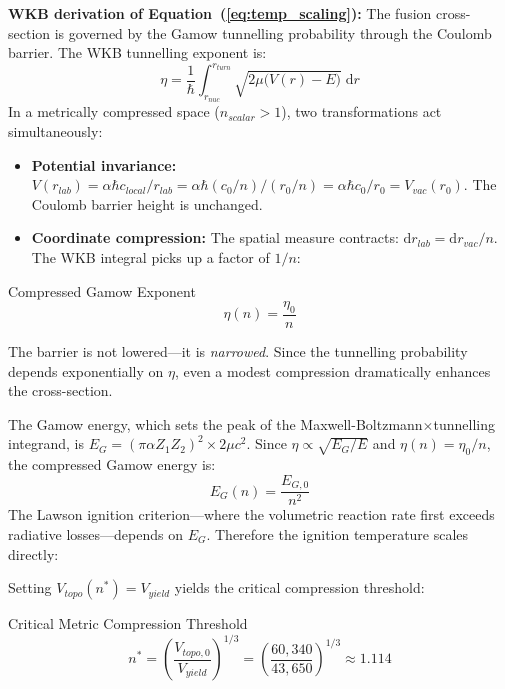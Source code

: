 \textbf{WKB derivation of Equation~(\ref{eq:temp_scaling}):} The fusion cross-section is governed by the Gamow tunnelling probability through the Coulomb barrier. The WKB tunnelling exponent is:
\begin{equation}
    \eta = \frac{1}{\hbar}\int_{r_{nuc}}^{r_{turn}}\! \sqrt{2\mu\bigl(V(r) - E\bigr)}\;\mathrm{d}r
    \label{eq:wkb_integral}
\end{equation}
In a metrically compressed space ($n_{scalar} > 1$), two transformations act simultaneously:
\begin{itemize}
    \item \textbf{Potential invariance:} $V(r_{lab}) = \alpha\hbar c_{local}/r_{lab} = \alpha\hbar(c_0/n)/(r_0/n) = \alpha\hbar c_0/r_0 = V_{vac}(r_0)$. The Coulomb barrier height is unchanged.
    \item \textbf{Coordinate compression:} The spatial measure contracts: $\mathrm{d}r_{lab} = \mathrm{d}r_{vac}/n$. The WKB integral picks up a factor of $1/n$:
\end{itemize}
\begin{resultbox}{Compressed Gamow Exponent}
\begin{equation}
    \eta(n) = \frac{\eta_0}{n}
    \label{eq:gamow_compressed}
\end{equation}
\end{resultbox}
The barrier is not lowered---it is \textit{narrowed}. Since the tunnelling probability depends exponentially on $\eta$, even a modest compression dramatically enhances the cross-section.

The Gamow energy, which sets the peak of the Maxwell-Boltzmann$\times$tunnelling integrand, is $E_G = (\pi \alpha Z_1 Z_2)^2 \times 2\mu c^2$. Since $\eta \propto \sqrt{E_G/E}$ and $\eta(n) = \eta_0/n$, the compressed Gamow energy is:
\begin{equation}
    E_G(n) = \frac{E_{G,0}}{n^2}
    \label{eq:gamow_energy_compressed}
\end{equation}
The Lawson ignition criterion---where the volumetric reaction rate first exceeds radiative losses---depends on $E_G$. Therefore the ignition temperature scales directly:

Setting $V_{topo}(n^*) = V_{yield}$ yields the critical compression threshold:
\begin{resultbox}{Critical Metric Compression Threshold}
\begin{equation}
    n^* = \left(\frac{V_{topo,0}}{V_{yield}}\right)^{1/3} = \left(\frac{60{,}340}{43{,}650}\right)^{1/3} \approx \mathbf{1.114}
    \label{eq:n_star}
\end{equation}
\end{resultbox}

